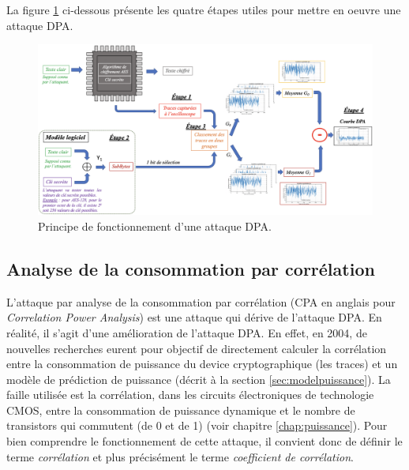 \documentclass[oneside]{book}
\begin{document}
\hspace{-0.5 cm} La figure \ref{fig:DPA} ci-dessous présente les quatre étapes utiles pour mettre en oeuvre une attaque DPA.
\begin{figure}[htbp]
    \hspace{-1cm}
    \includegraphics[scale=0.47]{image/DPA}
    \caption{Principe de fonctionnement d'une attaque DPA.}
    \label{fig:DPA}
\end{figure}


\subsection{Analyse de la consommation par corrélation}
\label{sec:CPA}

L'attaque par analyse de la consommation par corrélation (CPA en anglais pour \textit{Correlation Power Analysis}) est une attaque qui dérive de l’attaque DPA. En réalité, il s'agit d'une amélioration de l'attaque DPA. En effet, en 2004, de nouvelles recherches eurent pour objectif de directement calculer la corrélation entre la consommation de puissance du device cryptographique (les traces) et un modèle de prédiction de puissance (décrit à la section \ref{sec:modelpuissance}). La faille utilisée est la corrélation, dans les circuits électroniques de technologie CMOS, entre la consommation de puissance dynamique et le nombre de transistors qui commutent (de 0 et de 1) (voir chapitre \ref{chap:puissance}). Pour bien comprendre le fonctionnement de cette attaque, il convient donc de définir le terme \textit{corrélation} et plus précisément le terme \textit{coefficient de corrélation}.
\end{document}
